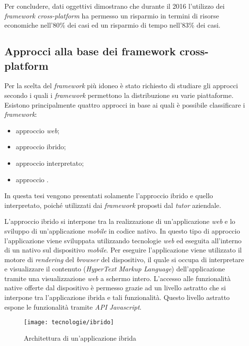 Per concludere, dati oggettivi dimostrano che durante il 2016 l'utilizzo dei \textit{framework cross-platform} ha permesso un risparmio in termini di risorse economiche nell'80\% dei casi ed un risparmio di tempo nell'83\% dei casi.

\subsection{Approcci alla base dei framework cross-platform}

Per la scelta del \textit{framework} più idoneo è stato richiesto di studiare gli approcci secondo i quali i \textit{framework} permettono la distribuzione su varie piattaforme. Esistono principalmente quattro approcci in base ai quali è possibile classificare i \textit{framework}:
\begin{itemize}
	\item approccio \textit{web};
	\item approccio ibrido;
	\item approccio interpretato;
	\item approccio .
\end{itemize}

In questa tesi vengono presentati solamente l'approccio ibrido e quello interpretato, poiché utilizzati dai \textit{framework} proposti dal \textit{tutor} aziendale.

L'approccio ibrido si interpone tra la realizzazione di un'applicazione \textit{web} e lo sviluppo di un'applicazione \textit{mobile} in codice nativo. In questo tipo di approccio l'applicazione viene sviluppata utilizzando tecnologie \textit{web} ed eseguita all'interno di un  nativo sul dispositivo \textit{mobile}. Per eseguire l'applicazione viene utilizzato il motore di \textit{rendering} del \textit{browser} del dispositivo, il quale si occupa di interpretare e visualizzare il contenuto  (\textit{HyperText Markup Language}) dell'applicazione tramite una visualizzazione \textit{web} a schermo intero. L'accesso alle funzionalità native offerte dal dispositivo è permesso grazie ad un livello astratto che si interpone tra l'applicazione ibrida e tali funzionalità. Questo livello astratto espone le funzionalità tramite \textit{API} \textit{Javascript}. 

\begin{figure}[!h] 
    \centering 
    \texttt{[image: tecnologie/ibrido]} 
    \caption{Architettura di un'applicazione ibrida}
\end{figure}

